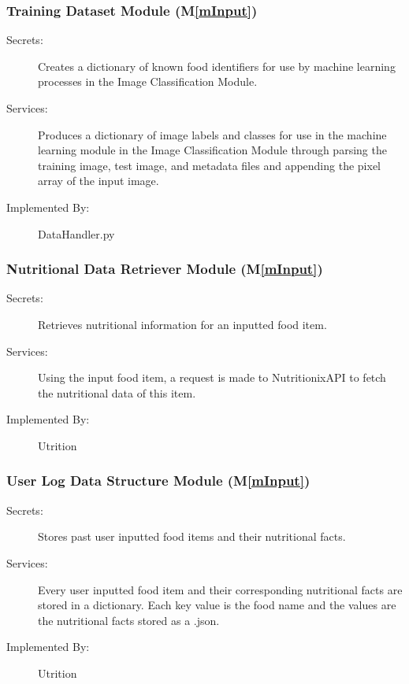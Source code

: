 \documentclass[12pt, titlepage]{article}
\newcommand{\mref}[1]{M\ref{#1}}
\begin{document}
\subsubsection{Training Dataset Module (\mref{mInput})}

\begin{description}
\item[Secrets:] Creates a dictionary of known food identifiers for use by machine learning processes in the Image Classification Module.
\item[Services:] Produces a dictionary of image labels and classes for use in the machine learning module in the Image Classification Module through parsing the training image, test image, and metadata files and appending the pixel array of the input image.
\item[Implemented By:] DataHandler.py
\end{description}

\subsubsection{Nutritional Data Retriever Module (\mref{mInput})}

\begin{description}
	\item[Secrets:]Retrieves nutritional information for an inputted food item.
	\item[Services:]Using the input food item, a request is made to NutritionixAPI to fetch the nutritional data of this item.
	\item[Implemented By:] Utrition
\end{description}

\subsubsection{User Log Data Structure Module (\mref{mInput})}

\begin{description}
	\item[Secrets:]Stores past user inputted food items and their nutritional facts.
	\item[Services:]Every user inputted food item and their corresponding nutritional facts are stored in a dictionary. Each key value is the food name and the values are the nutritional facts stored as a .json.
	\item[Implemented By:] Utrition
\end{description}
\end{document}
